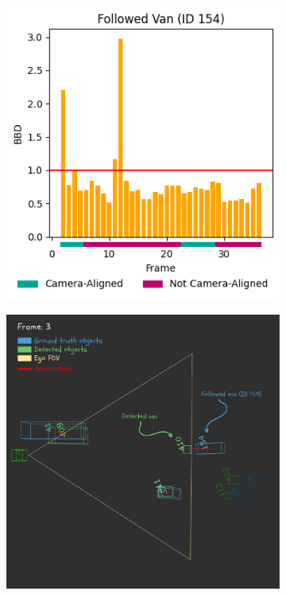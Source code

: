 \begin{figure}[!ht]
    \centering
    \begin{subfigure}[b]{0.32\textwidth}
        \includegraphics[width=\linewidth]{images/experiments/bbd_followed_van.png}
        \caption{}
        \label{fig:van_bbd_through_frames_a}
    \end{subfigure}
    \hfill
    \begin{subfigure}[b]{0.32\textwidth}
        \includegraphics[width=\textwidth]{images/experiments/evaluation_frames/3d_evaluation_frame_3_canva.png}

\end{subfigure}
\end{figure}
